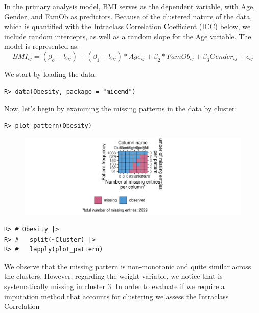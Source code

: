\documentclass[
  article]{jss}
\begin{document}
In the primary analysis model, BMI serves as the dependent variable,
with Age, Gender, and FamOb as predictors. Because of the clustered
nature of the data, which is quantified with the Intraclass Correlation
Coefficient (ICC) below, we include random intercepts, as well as a
random slope for the Age variable. The model is represented as:
\begin{equation}
\label{eqn:main}
BMI_{ij}= (\beta_{o}+ b_{oj} ) + (\beta_{1}+ b_{oj})* Age_{ij} + \beta_{2}*FamOb_{ij}+ \beta_{3}Gender_{ij} + \epsilon_{ij}
\end{equation}

We start by loading the data:

\begin{verbatim}
R> data(Obesity, package = "micemd")
\end{verbatim}

Now, let's begin by examining the missing patterns in the data by
cluster:

\begin{verbatim}
R> plot_pattern(Obesity)
\end{verbatim}

\begin{figure}[h]

{\centering \includegraphics{manuscript_files/figure-pdf/unnamed-chunk-48-1.pdf}

}

\end{figure}

\begin{verbatim}
R> # Obesity |> 
R> #   split(~Cluster) |>
R> #   lapply(plot_pattern)
\end{verbatim}

We observe that the missing pattern is non-monotonic and quite similar
across the clusters. However, regarding the weight variable, we notice
that is systematically missing in cluster 3. In order to evaluate if we
require a imputation method that accounts for clustering we assess the
Intraclass Correlation
\end{document}
